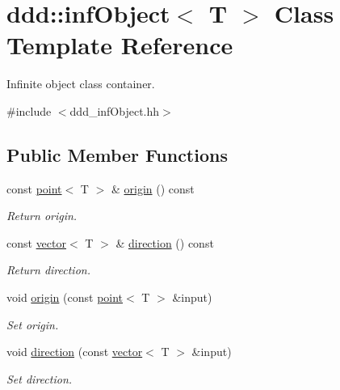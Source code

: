 \hypertarget{classddd_1_1inf_object}{}\section{ddd\+:\+:inf\+Object$<$ T $>$ Class Template Reference}
\label{classddd_1_1inf_object}


Infinite object class container.  




{\ttfamily \#include $<$ddd\+\_\+inf\+Object.\+hh$>$}

\subsection*{Public Member Functions}
\begin{DoxyCompactItemize}
\item 
\mbox{\label{classddd_1_1inf_object_a7238084b1c1a76b9e83b77219b985f91}} 
const \hyperlink{classddd_1_1point}{point}$<$ T $>$ \& \hyperlink{classddd_1_1inf_object_a7238084b1c1a76b9e83b77219b985f91}{origin} () const
\begin{DoxyCompactList}\small\item\em Return origin. \end{DoxyCompactList}\item 
\mbox{\label{classddd_1_1inf_object_ad14315d33bb67edb17ca60306fd991a1}} 
const \hyperlink{classddd_1_1vector}{vector}$<$ T $>$ \& \hyperlink{classddd_1_1inf_object_ad14315d33bb67edb17ca60306fd991a1}{direction} () const
\begin{DoxyCompactList}\small\item\em Return direction. \end{DoxyCompactList}\item 
void \hyperlink{classddd_1_1inf_object_a486961bee26e144e8b5e61ada65b2c4c}{origin} (const \hyperlink{classddd_1_1point}{point}$<$ T $>$ \&input)
\begin{DoxyCompactList}\small\item\em Set origin. \end{DoxyCompactList}\item 
void \hyperlink{classddd_1_1inf_object_a93dbc58a348a0408b945c3a7ab524135}{direction} (const \hyperlink{classddd_1_1vector}{vector}$<$ T $>$ \&input)
\begin{DoxyCompactList}\small\item\em Set direction. \end{DoxyCompactList}\item 

\end{DoxyCompactItemize}
